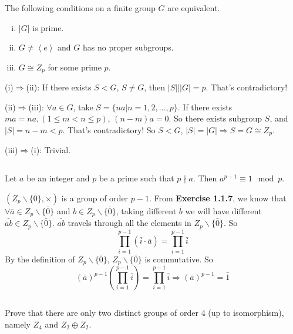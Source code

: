 $$ $$

\begin{ex}
    The following conditions on a finite group $G$ are equivalent.
    \begin{enumerate}[(i)]
        \item $\left| G \right| $ is prime.
        \item $G\neq \left\langle e\right\rangle$ and $G$ has no proper subgroups.
        \item $G\cong Z_{p}$ for some prime $p$.
    \end{enumerate}
\end{ex}

\begin{answer}
    (i)$\Rightarrow$(ii): If there exists $S<G$, $S\neq G$, then $\left| S \right| | \left| G \right| =p$. That's contradictory!

    (ii)$\Rightarrow$(iii): $\forall a\in G$, take $S=\{na|n=1,2,\dots,p\}$. If there exists $ma=na,(1\leq m<n\leq p)$, $(n-m)a=0$. So there exists subgroup $S$, and $\left| S \right|=n-m <p$. That's contradictory! So $S<G$, $\left| S \right| =\left| G \right| \Rightarrow S=G\cong Z_{p}$.

    (iii)$\Rightarrow$(i): Trivial.
\end{answer}

$$ $$

\begin{ex}
    Let $a$ be an integer and $p$ be a prime such that $p\nmid a$. Then $a^{p-1}\equiv 1\mod p$.
\end{ex}

\begin{answer}
    $(Z_{p}\backslash\{\bar{0}\},\times)$ is a group of order $p-1$. From \textbf{Exercise 1.1.7}, we know that $\forall \bar{a}\in Z_{p}\backslash\{\bar{0}\}$ and $b\in Z_{p}\backslash\{\bar{0}\}$, taking different $\bar{b}$ we will have different $\bar{ab}\in Z_{p}\backslash\{\bar{0}\}$. $\bar{ab}$ travels through all the elements in $Z_{p}\backslash\{\bar{0}\}$. So \[\prod_{i=1}^{p-1}(\bar{i}\cdot\bar{a})=\prod_{i=1}^{p-1}\bar{i}\] By the definition of $Z_{p}\backslash\{\bar{0}\}$, $Z_{p}\backslash\{\bar{0}\}$ is commutative. So \[(\bar{a})^{p-1}(\prod_{i=1}^{p-1}\bar{i})=\prod_{i=1}^{p-1}\bar{i}\Rightarrow(\bar{a})^{p-1}=\bar{1}\]
\end{answer}

$$ $$

\begin{ex}
    Prove that there are only two distinct groups of order 4 (up to isomorphism), namely $Z_{4}$ and $Z_{2}\oplus Z_{2}$.
\end{ex}

